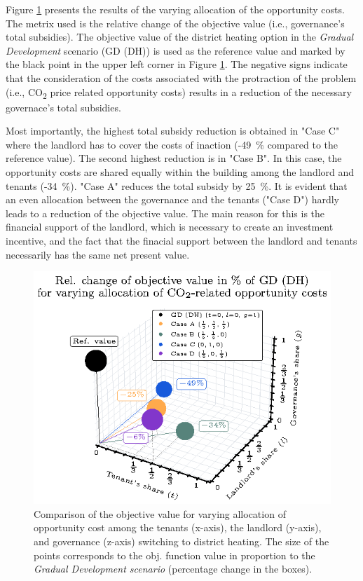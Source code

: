 Figure \ref{fig:3dplot} presents the results of the varying allocation of the opportunity costs. The metrix used is the relative change of the objective value (i.e., governance's total subsidies). The objective value of the district heating option in the \textit{Gradual Development} scenario (GD (DH)) is used as the reference value and marked by the black point in the upper left corner in Figure \ref{fig:3dplot}. The negative signs indicate that the consideration of the costs associated with the protraction of the problem (i.e., CO\textsubscript{2} price related opportunity costs) results in a reduction of the necessary governace's total subsidies.\vspace{0.5cm} 

Most importantly, the highest total subsidy reduction is obtained in "Case C" where the landlord has to cover the costs of inaction (-\SI{49}{\%} compared to the reference value). The second highest reduction is in "Case B". In this case, the opportunity costs are shared equally within the building among the landlord and tenants (-\SI{34}{\%}). "Case A" reduces the total subsidy by \SI{25}{\%}.  It is evident that an even allocation between the governance and the tenants ("Case D") hardly leads to a reduction of the objective value. The main reason for this is the financial support of the landlord, which is necessary to create an investment incentive, and the fact that the finacial support between the landlord and tenants necessarily has the same net present value.\vspace{0.5cm}

\begin{figure}[h]
	\centering
	\includegraphics[width=0.65\linewidth]{figures/4_Results/fig_3d_plot/3d.eps}
	\caption{Comparison of the objective value for varying allocation of opportunity cost among the tenants (x-axis), the landlord (y-axis), and governance (z-axis) switching to district heating. The size of the points corresponds to the obj. function value in proportion to the \textit{Gradual Development scenario} (percentage change in the boxes).}
	\label{fig:3dplot}
\end{figure}

